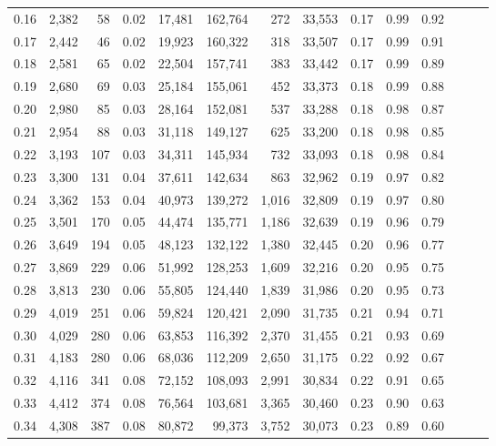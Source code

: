 \begin{tabular}{rrrrrrrrrrrrrr}
0.16 &  2,382 &   58 &  0.02 &   17,481 &  162,764 &     272 &  33,553 &  0.17 &  0.99 &      0.92 \\
0.17 &  2,442 &   46 &  0.02 &   19,923 &  160,322 &     318 &  33,507 &  0.17 &  0.99 &      0.91 \\
0.18 &  2,581 &   65 &  0.02 &   22,504 &  157,741 &     383 &  33,442 &  0.17 &  0.99 &      0.89 \\
0.19 &  2,680 &   69 &  0.03 &   25,184 &  155,061 &     452 &  33,373 &  0.18 &  0.99 &      0.88 \\
0.20 &  2,980 &   85 &  0.03 &   28,164 &  152,081 &     537 &  33,288 &  0.18 &  0.98 &      0.87 \\
0.21 &  2,954 &   88 &  0.03 &   31,118 &  149,127 &     625 &  33,200 &  0.18 &  0.98 &      0.85 \\
0.22 &  3,193 &  107 &  0.03 &   34,311 &  145,934 &     732 &  33,093 &  0.18 &  0.98 &      0.84 \\
0.23 &  3,300 &  131 &  0.04 &   37,611 &  142,634 &     863 &  32,962 &  0.19 &  0.97 &      0.82 \\
0.24 &  3,362 &  153 &  0.04 &   40,973 &  139,272 &   1,016 &  32,809 &  0.19 &  0.97 &      0.80 \\
0.25 &  3,501 &  170 &  0.05 &   44,474 &  135,771 &   1,186 &  32,639 &  0.19 &  0.96 &      0.79 \\
0.26 &  3,649 &  194 &  0.05 &   48,123 &  132,122 &   1,380 &  32,445 &  0.20 &  0.96 &      0.77 \\
0.27 &  3,869 &  229 &  0.06 &   51,992 &  128,253 &   1,609 &  32,216 &  0.20 &  0.95 &      0.75 \\
0.28 &  3,813 &  230 &  0.06 &   55,805 &  124,440 &   1,839 &  31,986 &  0.20 &  0.95 &      0.73 \\
0.29 &  4,019 &  251 &  0.06 &   59,824 &  120,421 &   2,090 &  31,735 &  0.21 &  0.94 &      0.71 \\
0.30 &  4,029 &  280 &  0.06 &   63,853 &  116,392 &   2,370 &  31,455 &  0.21 &  0.93 &      0.69 \\
0.31 &  4,183 &  280 &  0.06 &   68,036 &  112,209 &   2,650 &  31,175 &  0.22 &  0.92 &      0.67 \\
0.32 &  4,116 &  341 &  0.08 &   72,152 &  108,093 &   2,991 &  30,834 &  0.22 &  0.91 &      0.65 \\
0.33 &  4,412 &  374 &  0.08 &   76,564 &  103,681 &   3,365 &  30,460 &  0.23 &  0.90 &      0.63 \\
0.34 &  4,308 &  387 &  0.08 &   80,872 &   99,373 &   3,752 &  30,073 &  0.23 &  0.89 &      0.60 \\

\end{tabular}
